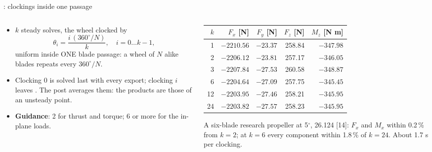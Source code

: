 \begin{frame}{: clockings inside one passage}
\begin{columns}[T]
\begin{column}{0.44\textwidth}
\begin{itemize}\small
  \item \(k\) steady solves, the wheel clocked by
        \[ \theta_i = \frac{i\,(360^\circ/N)}{k}, \quad i = 0 \ldots k-1, \]
        uniform inside ONE blade passage: a wheel of \(N\) alike blades
        repeats every \(360^\circ/N\).
  \item Clocking 0 is solved last with every export; clocking \(i\) leaves
        . The post averages them: the products are
        those of an unsteady point.
  \item \textbf{Guidance}: 2 for thrust and torque; 6 or more for the
        in-plane loads.
\end{itemize}
\end{column}
\begin{column}{0.52\textwidth}
{\ftstablesize\renewcommand{\arraystretch}{1.05}
\begin{tabular*}{\linewidth}{@{\extracolsep{\fill}}rrrrr@{}}
\toprule
\(k\) & \(F_x\) [N] & \(F_y\) [N] & \(F_z\) [N] & \(M_z\) [N m] \\
\midrule
1 & \(-2210.56\) & \(-23.37\) & 258.84 & \(-347.98\) \\
2 & \(-2206.12\) & \(-23.81\) & 257.17 & \(-346.05\) \\
3 & \(-2207.84\) & \(-27.53\) & 260.58 & \(-348.87\) \\
6 & \(-2204.64\) & \(-27.09\) & 257.75 & \(-345.45\) \\
12 & \(-2203.95\) & \(-27.46\) & 258.21 & \(-345.95\) \\
24 & \(-2203.82\) & \(-27.57\) & 258.23 & \(-345.95\) \\
\bottomrule
\end{tabular*}}
\par\vspace{1mm}
{\scriptsize A six-blade research propeller at 5\(^\circ\), 26.124 [14]:
\(F_x\) and \(M_x\) within 0.2\,\% from \(k = 2\); at \(k = 6\) every
component within 1.8\,\% of \(k = 24\). About 1.7 s per clocking.\par}
\end{column}
\end{columns}
\end{frame}

